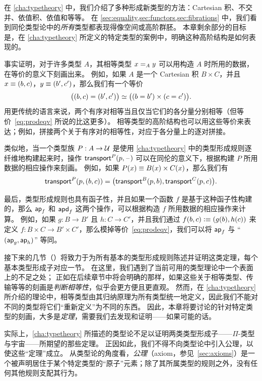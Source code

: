 在 \cref{cha:typetheory} 中，我们介绍了多种形成新类型的方法：Cartesian 积、不交并、依值积、依值和等等。
在 \cref{sec:equality,sec:functors,sec:fibrations} 中，我们看到同伦类型论中的\emph{所有}类型都表现得像空间或高阶群胚。
本章剩余部分的目标是，在 \cref{cha:typetheory} 所定义的特定类型的案例中，明确这种高阶结构是如何表现的。

事实证明，对于许多类型 $A$，其相等类型 $\id[A]xy$ 可以用构造 $A$ 时所用的数据，在等价的意义下刻画出来。
例如，如果 $A$ 是一个 Cartesian 积 $B\times C$，并且 $x\jdeq (b,c)$，$y\jdeq(b',c')$，那么我们有一个等价
\begin{equation}\label{eq:prodeqv}
  \eqv{\big((b,c)=(b',c')\big)}{\big((b=b')\times (c=c')\big)}.
\end{equation}
用更传统的语言来说，两个有序对相等当且仅当它们的各分量分别相等（但等价~\eqref{eq:prodeqv} 所说的比这更多）。
相等类型的高阶结构也可以用这些等价来表达；例如，拼接两个关于有序对的相等性，对应于各分量上的逐对拼接。

类似地，当一个类型族 $P:A\to\type$ 是使用 \cref{cha:typetheory} 中的类型形成规则逐纤维地构建起来时，操作 $\transfib{P}{p}{\blank}$ 可以在同伦的意义下，根据构建 $P$ 所用数据的相应操作来刻画。
例如，如果 $P(x) \jdeq B(x)\times C(x)$，那么我们有
\[\transfib{P}{p}{(b,c)} = \big(\transfib{B}{p}{b},\transfib{C}{p}{c}\big).\]

最后，类型形成规则也具有函子性，并且如果一个函数 $f$ 是基于这种函子性构建的，那么 $\apfunc f$ 和 $\apdfunc f$ 这两个操作，可以根据构造 $f$ 所用数据的相应操作来计算。
例如，如果 $g:B\to B'$ 且 $h:C\to C'$，并且我们通过 $f(b,c)\defeq (g(b),h(c))$ 来定义 $f:B\times C \to B'\times C'$，那么模掉等价~\eqref{eq:prodeqv}，我们可以将 $\apfunc f$ 与 ``$(\apfunc g,\apfunc h)$'' 等同。

接下来的几节（）将致力于为所有基本的类型形成规则陈述并证明这类定理，每个基本类型形成子对应一节。
在这里，我们遇到了当前可用的类型理论中一个表面上的不足之处；
正如在后续章节中将会明确的那样，如果这些关于相等类型、传输等等的刻画是\emph{判断相等性}，似乎会更方便且更直观。
然而，在 \cref{cha:typetheory} 所介绍的理论中，相等类型由其归纳原理为所有类型统一地定义，因此我们不能对不同的类型将它们``重新定义''为不同的东西。
因此，本章将要讨论的针对特定类型的刻画，大多是\emph{定理}，需要我们去发现和证明——如果可能的话。

实际上，\cref{cha:typetheory} 所描述的类型论不足以证明两类类型形成子——$\Pi$-类型与宇宙——所期望的那些定理。
正因如此，我们不得不向类型论中引入公理，以使这些``定理''成立。
从类型论的角度看，\emph{公理}（axiom，参见~\cref{sec:axioms}）是一个被声明居住于某个特定类型的``原子''元素；除了其所属类型的规则之外，没有任何其他规则支配其行为。
%

